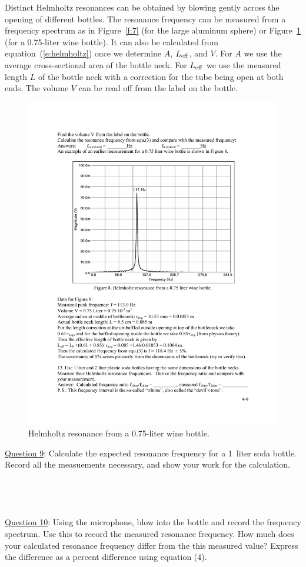 \documentclass[11pt]{NSF}
\begin{document}
Distinct Helmholtz resonances can be obtained by blowing 
gently across the opening of different bottles. 
The resonance frequency can be measured from a 
frequency spectrum as in Figure~\ref{f:7} (for the 
large aluminum sphere) or 
Figure~\ref{f:8} (for a 0.75-liter wine bottle).
It can also be calculated from equation~(\ref{e:helmholtz})
once we determine $A$, $L_{\rm eff}$, and $V$.
For $A$ we use the average cross-sectional area of the
bottle neck.
For $L_{\rm eff}$ we use the measured length $L$ of the 
bottle neck with a correction for the tube being open at 
both ends.
The volume $V$ can be read off from the label on the bottle.
%
\begin{figure}[hbtp]
\begin{center}
\includegraphics[width=.7\textwidth]{fig4_8}
\caption{Helmholtz resonance from a 0.75-liter wine bottle.}
\label{f:8} 
\end{center} 
\end{figure}
%


\underline{Question 9}: Calculate the expected resonance frequency for a 
1~liter soda bottle. Record all the measuements necessary, and show your work for the calculation.
\\
\\
\\
\\
\\

\underline{Question 10}: Using the microphone, blow into the bottle and record the frequency spectrum. Use this to record the measured resonance frequency. How much does your calculated resonance frequency differ from the this measured value? Express the difference as a percent difference using equation (4).
\\
\\
\\
\\
\\
\end{document}
